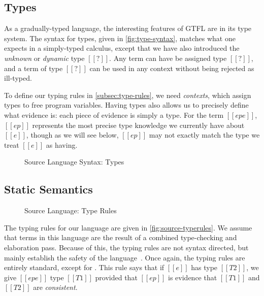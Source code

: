 \documentclass[11pt]{article}
\newcommand{\rrule}[1]{\rref*{#1}}
\begin{document}
\subsection{Types}
\label{subsec:source-types}

As a gradually-typed language, the interesting features of GTFL are in its type system.
The syntax for types, given in \autoref{fig:type-syntax}, matches what one expects in a simply-typed calculus, except that
we have also introduced the \textit{unknown} or \textit{dynamic} type $[[?]]$.
Any term can have be assigned type $[[?]]$, and a term of type $[[?]]$ can be used in
any context without being rejected as ill-typed.

To define our typing rules in \autoref{subsec:type-rules}, we need \textit{contexts}, which
assign types to free program variables. Having types also allows us to precisely define what evidence is:
each piece of evidence is simply a type. For the term $[[ep e]]$, $[[ep]]$ represents the most precise
type knowledge we currently have about $[[e]]$, though as we will see below,
$[[ep]]$ may not exactly match the type we treat $[[e]]$ as having.  


\begin{figure}[H]


	\caption{Source Language Syntax: Types}
	\label{fig:type-syntax}
\end{figure}

\subsection{Static Semantics}
\label{subsec:type-rules}

\begin{figure}[H]
	\ottdefnHastype{}
	\caption{Source Language: Type Rules}
	\label{fig:source-typerules}
\end{figure}

The typing rules for our language are given in \autoref{fig:source-typerules}.
We assume that terms in this language are the result of a combined type-checking
and elaboration pass. Because of this, the typing rules are not syntax directed,
but mainly establish the safety of the language~\citep{agt}.
Once again, the typing rules are entirely standard, except for \rrule{HastypeAscr}.
This rule says that if $[[e]]$ has type $[[T2]]$, we give $[[ep e]]$ type $[[T1]]$
provided that $[[ep]]$ is evidence that $[[T1]]$ and $[[T2]]$ are \textit{consistent}.
\end{document}
